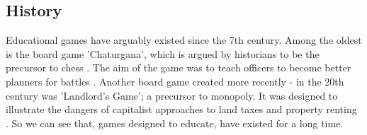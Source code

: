 \documentclass[a4paper,11.5pt]{report}
\numberwithin{figure}{section}
\numberwithin{table}{section}
\numberwithin{equation}{section}
\numberwithin{equation}{section}
\begin{document}




\subsection{History}

Educational games have arguably existed since the 7th century. Among the oldest is the board game 'Chaturgana', which is argued by historians to be the precursor to chess \citep{Wilkinson2016}. The aim of the game was to teach officers to become better planners for battles \citep{Wilkinson2016}. Another board game created more recently - in the 20th century was 'Landlord's Game'; a precursor to monopoly. It was designed to illustrate the dangers of capitalist approaches to land taxes and property renting \citep{Wilkinson2016}. So we can see that, games designed to educate, have existed for a long time.


\end{document}
